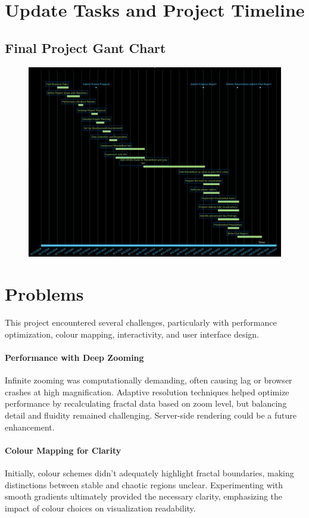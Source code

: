 \documentclass[12pt,a4paper]{report}
\begin{document}
\section{Update Tasks and Project Timeline}

\subsection{Final Project Gant Chart}
\begin{figure}[H]
\centering
\includegraphics[width=\textwidth]{images/project gant chart.png}
\end{figure}

\section{Problems}
This project encountered several challenges, particularly with performance optimization, colour mapping, interactivity, and user interface design. 

\paragraph{Performance with Deep Zooming}
Infinite zooming was computationally demanding, often causing lag or browser crashes at high magnification. Adaptive resolution techniques helped optimize performance by recalculating fractal data based on zoom level, but balancing detail and fluidity remained challenging. Server-side rendering could be a future enhancement. 

\paragraph{Colour Mapping for Clarity}
Initially, colour schemes didn’t adequately highlight fractal boundaries, making distinctions between stable and chaotic regions unclear. Experimenting with smooth gradients ultimately provided the necessary clarity, emphasizing the impact of colour choices on visualization readability. 
\end{document}
